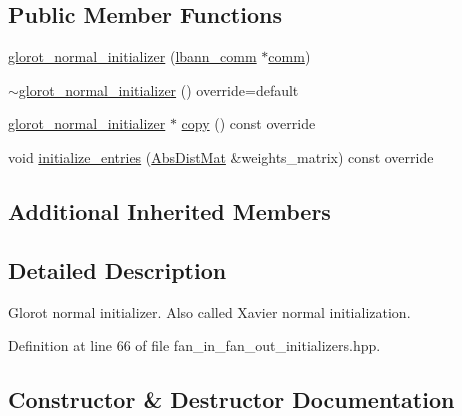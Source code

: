 \subsection*{Public Member Functions}
\begin{DoxyCompactItemize}
\item 
\hyperlink{classlbann_1_1glorot__normal__initializer_ab2f600c58e8f5d978adf06802e6330d3}{glorot\+\_\+normal\+\_\+initializer} (\hyperlink{classlbann_1_1lbann__comm}{lbann\+\_\+comm} $\ast$\hyperlink{file__io_8cpp_ab048c6f9fcbcfaa57ce68b00263dbebe}{comm})
\item 
\hyperlink{classlbann_1_1glorot__normal__initializer_ac32dcf5794eae771955feaaf4557760b}{$\sim$glorot\+\_\+normal\+\_\+initializer} () override=default
\item 
\hyperlink{classlbann_1_1glorot__normal__initializer}{glorot\+\_\+normal\+\_\+initializer} $\ast$ \hyperlink{classlbann_1_1glorot__normal__initializer_a8d05bb2c3d56a5dc3ca4be2a62640470}{copy} () const override
\item 
void \hyperlink{classlbann_1_1glorot__normal__initializer_a0bd7253159fe5ca9039af44b7fca1709}{initialize\+\_\+entries} (\hyperlink{base_8hpp_a9a697a504ae84010e7439ffec862b470}{Abs\+Dist\+Mat} \&weights\+\_\+matrix) const override
\end{DoxyCompactItemize}
\subsection*{Additional Inherited Members}


\subsection{Detailed Description}
Glorot normal initializer. Also called Xavier normal initialization. 

Definition at line 66 of file fan\+\_\+in\+\_\+fan\+\_\+out\+\_\+initializers.\+hpp.



\subsection{Constructor \& Destructor Documentation}
\mbox{\label{classlbann_1_1glorot__normal__initializer_ab2f600c58e8f5d978adf06802e6330d3}} 
